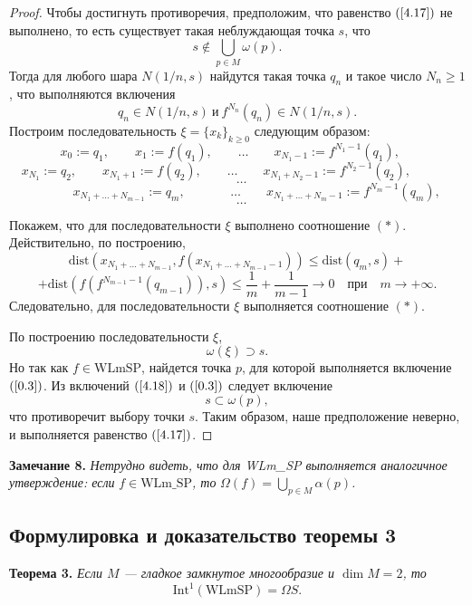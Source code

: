\documentclass[12pt]{article}
\begin{document}
\begin{proof} Чтобы достигнуть противоречия, предположим, что равенство $(\ref{4.17})$ не выполнено, то есть существует такая неблуждающая точка $s$, что
$$s\notin\bigcup_{p\in M}\omega(p).$$
Тогда для любого шара $N(1/n,s)$ найдутся такая точка $q_n$ и такое число $N_n\geq1$, что выполняются включения
$$q_n\in N(1/n,s)\ \textrm{и}\ f^{N_n}(q_n)\in N(1/n,s).$$
Построим последовательность $\xi=\{x_k\}_{k\geq0}$ следующим образом:
$$x_0:=q_1,\qquad x_1:=f(q_1),\qquad \ldots\qquad x_{N_1-1}:=f^{N_1-1}(q_1),\ \ \ \ \ $$
$$x_{N_1}:=q_2,\qquad x_{N_1+1}:=f(q_2),\qquad \ldots\qquad x_{N_1+N_2-1}:=f^{N_2-1}(q_2),\ \ \ \ \ \ \ \ \ \ \ \ \ \ \ $$
$$\ \ \ \ \ \ \ \ldots \ \ \ \ $$
$$\ \ \ \ \ \ \ \ \ \ \ \ \ \ x_{N_1+\ldots+N_{m-1}}:=q_{m},\qquad\ \ \ \ \ \ \ \ldots\qquad x_{N_1+\ldots+N_m-1}:=f^{N_m-1}(q_m),$$
$$\ \ \ \ldots$$

Покажем, что для последовательности $\xi$ выполнено соотношение $(*)$.
Действительно, по построению,
$$\textrm{dist}\left(x_{N_1+\ldots+N_{m-1}},f(x_{N_1+\ldots+N_{m-1}-1})\right)\leq \textrm{dist}\left(q_m,s\right)+$$
$$+\textrm{dist}\left(f(f^{N_{m-1}-1}(q_{m-1})),s\right)\leq \frac{1}{m}+\frac{1}{m-1}\longrightarrow0\quad\textrm{при}\quad m\rightarrow+\infty.$$
Следовательно, для последовательности $\xi$ выполняется соотношение $(*)$.

По построению последовательности $\xi$,
\begin{equation}
\label{4.18}
\omega(\xi)\supset s.
\end{equation} 
Но так как $f\in \textrm{WLmSP}$, найдется точка $p$, для которой выполняется включение $(\ref{0.3})$.
Из включений $(\ref{4.18})$ и $(\ref{0.3})$ следует включение
$$s\subset\omega(p),$$
что противоречит выбору точки $s$. Таким образом, наше предположение неверно, и выполняется равенство $(\ref{4.17})$.
\end{proof} 
 
 \textbf{Замечание 8.} \textit{Нетрудно видеть, что для WLm\_SP выполняется аналогичное утверждение:
 если} $f\in\textrm{WLm\_SP}$\textit{, то} $\Omega(f)=\bigcup_{p\in M}\alpha(p)$\textit{.}

\subsection{Формулировка и доказательство теоремы 3}

\textbf{Теорема 3.} \textit{Если $M$ --- гладкое замкнутое многообразие и $\dim M=2$, то}
$$\mbox{Int}^1(\mbox{WLmSP})=\Omega S.$$
\end{document}
